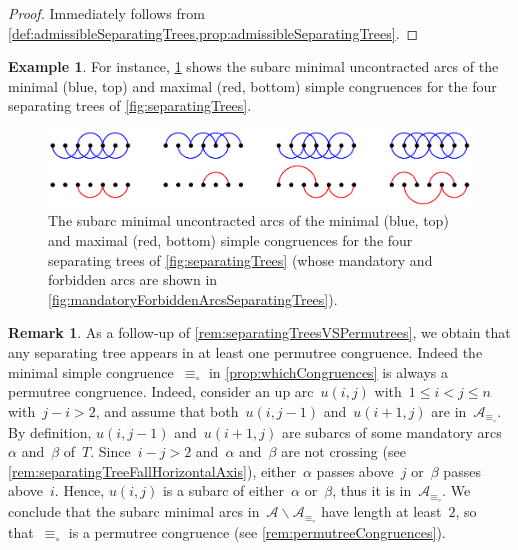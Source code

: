 \documentclass{amsart}
\theoremstyle{definition}
\newtheorem{example}[theorem]{Example}
\newtheorem{remark}[theorem]{Remark}
\newcommand{\ssm}{\smallsetminus} %
\newcommand{\arcs}{{\mathcal{A}}} %
\begin{document}
\begin{proof}
Immediately follows from \cref{def:admissibleSeparatingTrees,prop:admissibleSeparatingTrees}.
\end{proof}

\begin{example}
For instance, \cref{fig:minMaxCongruencesSeparatingTrees} shows the subarc minimal uncontracted arcs of the minimal (blue, top) and maximal (red, bottom) simple congruences for the four separating trees of \cref{fig:separatingTrees}.
\begin{figure}
	\capstart
	\centerline{\includegraphics[scale=.85]{minMaxCongruencesSeparatingTrees}}
	\caption{The subarc minimal uncontracted arcs of the minimal (blue, top) and maximal (red, bottom) simple congruences for the four separating trees of \cref{fig:separatingTrees} (whose mandatory and forbidden arcs are shown in \cref{fig:mandatoryForbiddenArcsSeparatingTrees}).}
	\label{fig:minMaxCongruencesSeparatingTrees}
\end{figure}
\end{example}

\begin{remark}
\label{rem:separatingTreesArePermutrees}
As a follow-up of \cref{rem:separatingTreesVSPermutrees}, we obtain that any separating tree appears in at least one permutree congruence.
Indeed the minimal simple congruence~$\equiv_\circ$ in \cref{prop:whichCongruences} is always a permutree congruence.
Indeed, consider an up arc~$u(i, j)$ with~$1 \le i < j \le n$ with~$j-i > 2$, and assume that both~$u(i,j-1)$ and~$u(i+1,j)$ are in~$\arcs_{\equiv_\circ}$.
By definition, $u(i,j-1)$ and~$u(i+1,j)$ are subarcs of some mandatory arcs~$\alpha$ and~$\beta$ of~$T$.
Since~$i-j > 2$ and~$\alpha$ and~$\beta$ are not crossing (see \cref{rem:separatingTreeFallHorizontalAxis}), either~$\alpha$ passes above~$j$ or~$\beta$ passes above~$i$.
Hence, $u(i,j)$ is a subarc of either~$\alpha$ or~$\beta$, thus it is in~$\arcs_{\equiv_\circ}$.
We conclude that the subarc minimal arcs in~$\arcs \ssm \arcs_{\equiv_\circ}$ have length at least~$2$, so that~$\equiv_\circ$ is a permutree congruence (see \cref{rem:permutreeCongruences}).
\end{remark}
\end{document}
